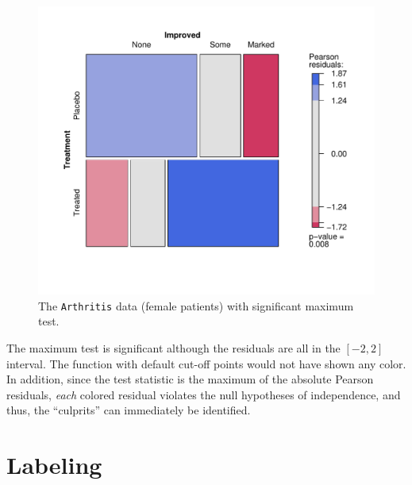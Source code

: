 \documentclass{Z}
\newcommand{\data}[1]{\texttt{#1}}
\newcommand{\codefun}[1]{\code{#1()}}
\begin{document}
\begin{figure}[h]
\begin{center}
\includegraphics{strucplot-arthritisfig}
\caption{The \data{Arthritis} data (female patients) with significant maximum test.}
\label{fig:maximum}
\end{center}
\end{figure}

\noindent The maximum test is significant although the residuals are
all in the $\left[-2,2\right]$ interval.
The \codefun{shading\_hcl} function with default cut-off points would
not have shown any color. In addition, since the test statistic is the
maximum of the absolute Pearson residuals, \emph{each} colored
residual violates the null hypotheses of independence, and thus, the
``culprits'' can immediately be identified.

\clearpage
\section[Labeling]{Labeling}
\label{sec:labeling}
\end{document}
